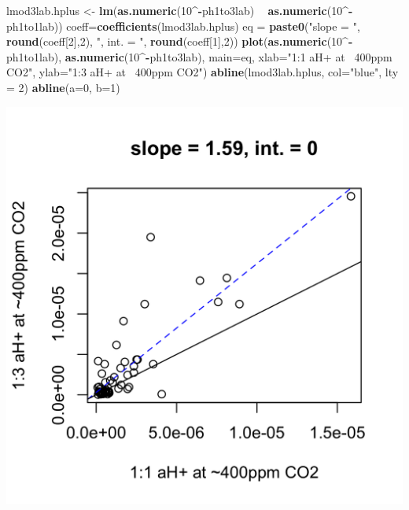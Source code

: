\documentclass[]{article}
\newenvironment{Shaded}{\begin{snugshade}}{\end{snugshade}}
\newcommand{\DataTypeTok}[1]{\textcolor[rgb]{0.13,0.29,0.53}{#1}}
\newcommand{\DecValTok}[1]{\textcolor[rgb]{0.00,0.00,0.81}{#1}}
\newcommand{\KeywordTok}[1]{\textcolor[rgb]{0.13,0.29,0.53}{\textbf{#1}}}
\newcommand{\NormalTok}[1]{#1}
\newcommand{\OperatorTok}[1]{\textcolor[rgb]{0.81,0.36,0.00}{\textbf{#1}}}
\newcommand{\StringTok}[1]{\textcolor[rgb]{0.31,0.60,0.02}{#1}}
\begin{document}
\begin{Shaded}
\begin{Highlighting}[]
\NormalTok{lmod3lab.hplus <-}\StringTok{ }\KeywordTok{lm}\NormalTok{(}\KeywordTok{as.numeric}\NormalTok{(}\DecValTok{10}\OperatorTok{^-}\NormalTok{ph1to3lab) }\OperatorTok{~}\StringTok{ }\KeywordTok{as.numeric}\NormalTok{(}\DecValTok{10}\OperatorTok{^-}\NormalTok{ph1to1lab))}
\NormalTok{coeff=}\KeywordTok{coefficients}\NormalTok{(lmod3lab.hplus)}
\NormalTok{eq =}\StringTok{ }\KeywordTok{paste0}\NormalTok{(}\StringTok{"slope = "}\NormalTok{, }\KeywordTok{round}\NormalTok{(coeff[}\DecValTok{2}\NormalTok{],}\DecValTok{2}\NormalTok{), }\StringTok{", int. = "}\NormalTok{, }\KeywordTok{round}\NormalTok{(coeff[}\DecValTok{1}\NormalTok{],}\DecValTok{2}\NormalTok{))}
\KeywordTok{plot}\NormalTok{(}\KeywordTok{as.numeric}\NormalTok{(}\DecValTok{10}\OperatorTok{^-}\NormalTok{ph1to1lab), }\KeywordTok{as.numeric}\NormalTok{(}\DecValTok{10}\OperatorTok{^-}\NormalTok{ph1to3lab), }\DataTypeTok{main=}\NormalTok{eq,}
   \DataTypeTok{xlab=}\StringTok{"1:1 aH+ at ~400ppm CO2"}\NormalTok{, }\DataTypeTok{ylab=}\StringTok{"1:3 aH+ at ~400ppm CO2"}\NormalTok{)}
\KeywordTok{abline}\NormalTok{(lmod3lab.hplus, }\DataTypeTok{col=}\StringTok{"blue"}\NormalTok{, }\DataTypeTok{lty =} \DecValTok{2}\NormalTok{)}
\KeywordTok{abline}\NormalTok{(}\DataTypeTok{a=}\DecValTok{0}\NormalTok{, }\DataTypeTok{b=}\DecValTok{1}\NormalTok{)}
\end{Highlighting}
\end{Shaded}

\includegraphics{output-rmd/whitman-figure-request-3-lab-hplus-spooner-1.png}
\end{document}
